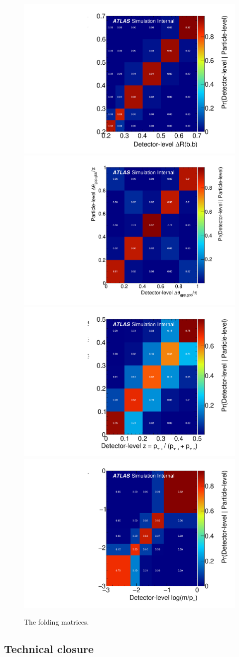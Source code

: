 \begin{figure}[htpb!]
\begin{center}
  \includegraphics[width=0.45\linewidth]{figures/gbb/Unfolding/dR_ResponseMatrix_y.pdf}
  \includegraphics[width=0.45\linewidth]{figures/gbb/Unfolding/dphi_ResponseMatrix_y.pdf}\\
  \includegraphics[width=0.45\linewidth]{figures/gbb/Unfolding/ZpT_ResponseMatrix_y.pdf}
  \includegraphics[width=0.45\linewidth]{figures/gbb/Unfolding/fracmasspt_ResponseMatrix_y.pdf}
\caption[]{The folding matrices.  } 
\label{fig:gbb-responsematrix2}
\end{center}
\end{figure}

\clearpage

\subsection{Technical closure}
\label{sec:gbb-unfolding:technicalclosure}

